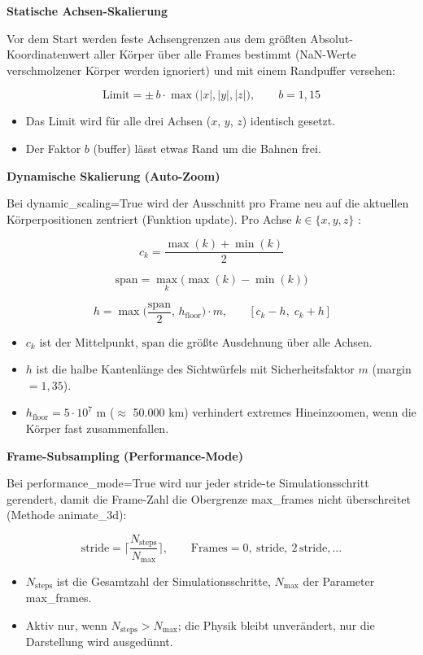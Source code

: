 \documentclass[11pt]{article}
\providecommand{\tightlist}{%
      \setlength{\itemsep}{0pt}\setlength{\parskip}{0pt}}
\begin{document}
\textbf{Statische Achsen-Skalierung}

Vor dem Start werden feste Achsengrenzen aus dem größten
Absolut-Koordinatenwert aller Körper über alle Frames bestimmt
(NaN-Werte verschmolzener Körper werden ignoriert) und mit einem
Randpuffer versehen:

\[
\text{Limit} = \pm\, b \cdot \max\big(|x|,|y|,|z|\big), \qquad b = 1{,}15
\]

\begin{itemize}
\tightlist
\item
  Das Limit wird für alle drei Achsen (\(x\), \(y\), \(z\)) identisch
  gesetzt.
\item
  Der Faktor \(b\) (buffer) lässt etwas Rand um die Bahnen frei.
\end{itemize}

\textbf{Dynamische Skalierung (Auto-Zoom)}

Bei dynamic\_scaling=True wird der Ausschnitt pro Frame neu auf die
aktuellen Körperpositionen zentriert (Funktion update). Pro Achse
\(k\in\{x,y,z\}\) \cite{quelle10}:

\[
c_k = \frac{\max(k)+\min(k)}{2}
\]

\[
\text{span} = \max_k\big(\max(k)-\min(k)\big)
\]

\[
h = \max\!\Big(\frac{\text{span}}{2},\, h_{\text{floor}}\Big)\cdot m, \qquad \big[\,c_k-h,\; c_k+h\,\big]
\]

\begin{itemize}
\tightlist
\item
  \(c_k\) ist der Mittelpunkt, \(\text{span}\) die größte Ausdehnung
  über alle Achsen.
\item
  \(h\) ist die halbe Kantenlänge des Sichtwürfels mit Sicherheitsfaktor
  \(m\) (margin \(=1{,}35\)).
\item
  \(h_{\text{floor}} = 5\cdot10^{7}\) m (\(\approx\) 50.000 km)
  verhindert extremes Hineinzoomen, wenn die Körper fast zusammenfallen.
\end{itemize}

\textbf{Frame-Subsampling (Performance-Mode)}

Bei performance\_mode=True wird nur jeder stride-te Simulationsschritt
gerendert, damit die Frame-Zahl die Obergrenze max\_frames nicht
überschreitet (Methode animate\_3d):

\[
\text{stride} = \Big\lceil \frac{N_{\text{steps}}}{N_{\max}} \Big\rceil, \qquad \text{Frames}=0,\ \text{stride},\ 2\,\text{stride},\dots
\]

\begin{itemize}
\tightlist
\item
  \(N_{\text{steps}}\) ist die Gesamtzahl der Simulationsschritte,
  \(N_{\max}\) der Parameter max\_frames.
\item
  Aktiv nur, wenn \(N_{\text{steps}} > N_{\max}\); die Physik bleibt
  unverändert, nur die Darstellung wird ausgedünnt.
\end{itemize}
\end{document}

